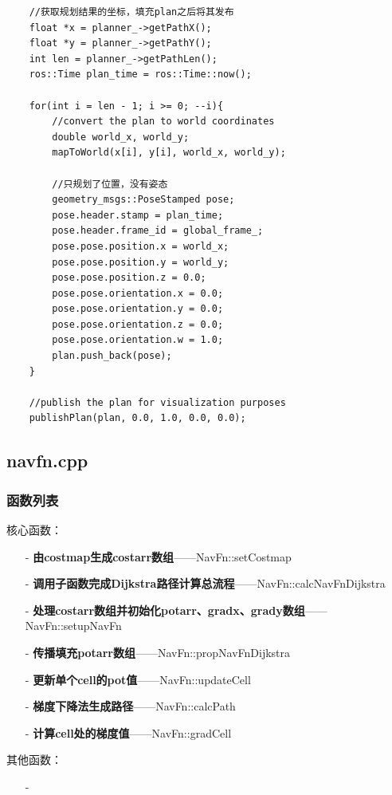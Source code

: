 \documentclass[9pt, oneside]{book}
\begin{document}
\begin{verbatim}
    //获取规划结果的坐标，填充plan之后将其发布
    float *x = planner_->getPathX();
    float *y = planner_->getPathY();
    int len = planner_->getPathLen();
    ros::Time plan_time = ros::Time::now();

    for(int i = len - 1; i >= 0; --i){
        //convert the plan to world coordinates
        double world_x, world_y;
        mapToWorld(x[i], y[i], world_x, world_y);

        //只规划了位置，没有姿态
        geometry_msgs::PoseStamped pose;
        pose.header.stamp = plan_time;
        pose.header.frame_id = global_frame_;
        pose.pose.position.x = world_x;
        pose.pose.position.y = world_y;
        pose.pose.position.z = 0.0;
        pose.pose.orientation.x = 0.0;
        pose.pose.orientation.y = 0.0;
        pose.pose.orientation.z = 0.0;
        pose.pose.orientation.w = 1.0;
        plan.push_back(pose);
    }

    //publish the plan for visualization purposes
    publishPlan(plan, 0.0, 1.0, 0.0, 0.0);
\end{verbatim}

\subsection{navfn.cpp}

\subsubsection{函数列表}

核心函数：
\begin{itemize}
    \item [-] \textbf{由costmap生成costarr数组}——NavFn::setCostmap
    \item [-] \textbf{调用子函数完成Dijkstra路径计算总流程}——NavFn::calcNavFnDijkstra
    \item [-] \textbf{处理costarr数组并初始化potarr、gradx、grady数组}——NavFn::setupNavFn
    \item [-] \textbf{传播填充potarr数组}——NavFn::propNavFnDijkstra
    \item [-] \textbf{更新单个cell的pot值}——NavFn::updateCell
    \item [-] \textbf{梯度下降法生成路径}——NavFn::calcPath 
    \item [-] \textbf{计算cell处的梯度值}——NavFn::gradCell
\end{itemize}
    
其他函数：
\begin{itemize}
    \item [-] 
\end{itemize}
\end{document}

